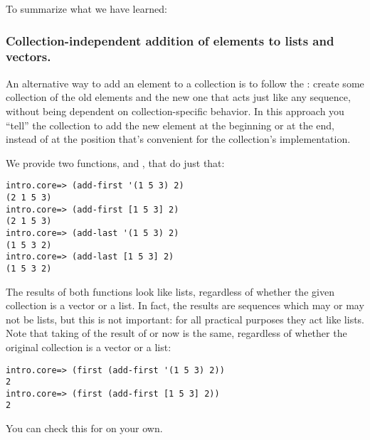 To summarize what we have learned: 


\subsubsection{Collection-independent addition of elements to lists and vectors. }\label{subsubsec:add-first-last}
An alternative way to add an element to a collection is to follow the : create some collection of the old elements and the new one that acts just like any sequence, without being dependent on collection-specific behavior. In this approach you ``tell'' the collection to add the new element at the beginning or at the end, instead of at the position that's convenient for the collection's implementation. 

We provide two functions,  and , that do just that: 
\begin{framed}
\begin{verbatim}
intro.core=> (add-first '(1 5 3) 2)
(2 1 5 3)
intro.core=> (add-first [1 5 3] 2)
(2 1 5 3)
intro.core=> (add-last '(1 5 3) 2)
(1 5 3 2)
intro.core=> (add-last [1 5 3] 2)
(1 5 3 2)
\end{verbatim}
\end{framed}
The results of both functions look like lists, regardless of whether the given collection is a vector or a list. In fact, the results are sequences which may or may not be lists, but this is not important: for all practical purposes they act like lists.  Note that taking  of the result of  or  now is the same, regardless of whether the original collection is a vector or a list:
\begin{framed}
\begin{verbatim}
intro.core=> (first (add-first '(1 5 3) 2))
2
intro.core=> (first (add-first [1 5 3] 2))
2
\end{verbatim}
\end{framed}
You can check this for  on your own. 


